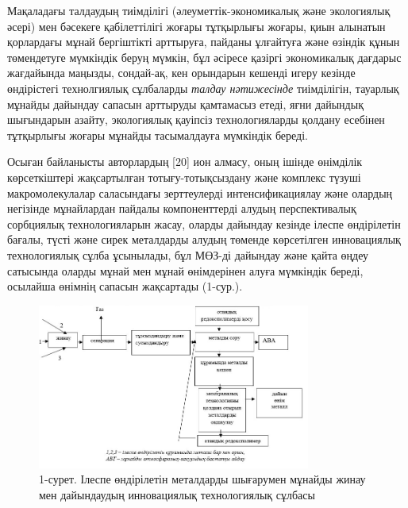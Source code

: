 \begin{multicols}{2}
Мақаладағы талдаудың тиімділігі (әлеуметтік-экономикалық және
экологиялық әсері) мен бәсекеге қабілеттілігі жоғары тұтқырлығы жоғары,
қиын алынатын қорлардағы мұнай бергіштікті арттыруға, пайданы ұлғайтуға
және өзіндік құнын төмендетуге мүмкіндік беруң мүмкін, бұл әсіресе
қазіргі экономикалық дағдарыс жағдайында маңызды, сондай-ақ, кен
орындарын кешенді игеру кезінде өндірістегі технолгиялық сұлбаларды
\emph{талдау нәтижесінде} тиімділігін, тауарлық мұнайды дайындау сапасын
арттыруды қамтамасыз етеді, яғни дайындық шығындарын азайту, экологиялық
қауіпсіз технологияларды қолдану есебінен тұтқырлығы жоғары мұнайды
тасымалдауға мүмкіндік береді.

Осыған байланысты авторлардың {[}20{]} ион алмасу, оның ішінде өнімділік
көрсеткіштері жақсартылған тотығу-тотықсыздану және комплекс түзуші
макромолекулалар саласындағы зерттеулерді интенсификациялау және олардың
негізінде мұнайлардан пайдалы компоненттерді алудың перспективалық
сорбциялық технологияларын жасау, оларды дайындау кезінде ілеспе
өндірілетін бағалы, түсті және сирек металдарды алудың төменде
көрсетілген инновациялық технологиялық сұлба ұсынылады, бұл МӨЗ-ді
дайындау және қайта өңдеу сатысында оларды мұнай мен мұнай өнімдерінен
алуға мүмкіндік береді, осылайша өнімнің сапасын жақсартады (1-сур.).
\end{multicols}


\begin{figure}[H]
	\centering
	\includegraphics[width=0.8\textwidth]{media/gor/image21.2}
	\caption*{1-сурет. Ілеспе өндірілетін металдарды шығарумен мұнайды жинау
  мен дайындаудың инновациялық технологиялық сұлбасы}
\end{figure}

